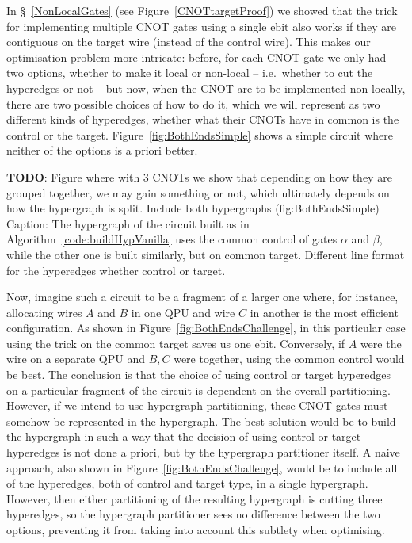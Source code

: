In \S~\ref{NonLocalGates} (see Figure~\ref{CNOTtargetProof}) we showed that the trick for implementing multiple CNOT gates using a single ebit also works if they are contiguous on the target wire (instead of the control wire). This makes our optimisation problem more intricate: before, for each CNOT gate we only had two options, whether to make it local or non-local -- i.e.\ whether to cut the hyperedges or not -- but now, when the CNOT are to be implemented non-locally, there are two possible choices of how to do it, which we will represent as two different kinds of hyperedges, whether what their CNOTs have in common is the control or the target. Figure~\ref{fig:BothEndsSimple} shows a simple circuit where neither of the options is a priori better. 

\textbf{TODO}: Figure where with 3 CNOTs we show that depending on how they are grouped together, we may gain something or not, which ultimately depends on how the hypergraph is split. Include both hypergraphs (fig:BothEndsSimple) Caption: The hypergraph of the circuit built as in Algorithm~\ref{code:buildHypVanilla} uses the common control of gates \(\alpha\) and \(\beta\), while the other one is built similarly, but on common target. Different line format for the hyperedges whether control or target.

Now, imagine such a circuit to be a fragment of a larger one where, for instance, allocating wires \(A\) and \(B\) in one QPU and wire \(C\) in another is the most efficient configuration. As shown in Figure~\ref{fig:BothEndsChallenge}, in this particular case using the trick on the common target saves us one ebit. Conversely, if \(A\) were the wire on a separate QPU and \(B,C\) were together, using the common control would be best. The conclusion is that the choice of using control or target hyperedges on a particular fragment of the circuit is dependent on the overall partitioning. However, if we intend to use hypergraph partitioning, these CNOT gates must somehow be represented in the hypergraph. The best solution would be to build the hypergraph in such a way that the decision of using control or target hyperedges is not done a priori, but by the hypergraph partitioner itself. A naive approach, also shown in Figure~\ref{fig:BothEndsChallenge}, would be to include all of the hyperedges, both of control and target type, in a single hypergraph. However, then either partitioning of the resulting hypergraph is cutting three hyperedges, so the hypergraph partitioner sees no difference between the two options, preventing it from taking into account this subtlety when optimising.

